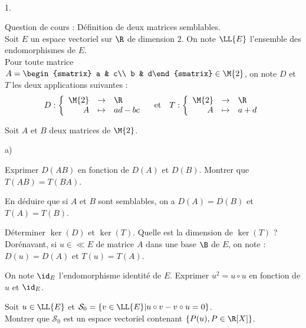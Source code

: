 \documentclass[11pt]{article}%
\begin{document}
\begin{exerciceAP}~
  \begin{noliste}{1.}
    \setlength{\itemsep}{2mm}
  \item Question de cours : Définition de deux matrices semblables.\\
    Soit $E$ un espace vectoriel sur $\R$ de dimension $2$. On note
    $\LL{E}$ l'ensemble des endomorphismes de $E$.\\
    Pour toute matrice $A=\begin{smatrix} a & c\\ b & d\end{smatrix}
    \in\M{2}$, on note $D$ et $T$ les deux applications suivantes :
    \[
    D:\left\{
      \begin{array}{rcl}
        \M{2} & \rightarrow & \R\\
        A & \mapsto & ad-bc
      \end{array}
    \right. \quad \mbox{et} \quad T:\left\{
      \begin{array}{rcl}
        \M{2} & \rightarrow & \R\\
        A & \mapsto & a+d
      \end{array}
    \right.
    \]

  \item Soit $A$ et $B$ deux matrices de $\M{2}$.
    \begin{noliste}{a)}
    \setlength{\itemsep}{2mm}
    \item Exprimer $D(AB)$ en fonction de $D(A)$ et $D(B)$. Montrer
      que $T(AB)=T(BA)$.
    \item En déduire que si $A$ et $B$ sont semblables, on a
      $D(A)=D(B)$ et $T(A)=T(B)$.
    \end{noliste}

  \item Déterminer $\ker(D)$ et $\ker(T)$. Quelle est la dimension de
    $\ker(T)$ ?\\
    Dorénavant, si $u\in\ll{E}$ de matrice $A$ dans une base $\B$ de
    $E$, on note : $D(u)=D(A)$ et $T(u)=T(A)$.

  \item On note $\id_E$ l'endomorphisme identité de $E$. Exprimer
    $u^2=u\circ u$ en fonction de $u$ et $\id_E$.

  \item Soit $u\in\LL{E}$ et $\mathcal{S}_0=\{v\in\LL{E} \vert u \circ
    v-v\circ u=0\}$.\\
    Montrer que $\mathcal{S}_0$ est un espace vectoriel contenant
    $\{P(u),P\in\R[X]\}$.


\end{noliste}
\end{exerciceAP}
\end{document}
